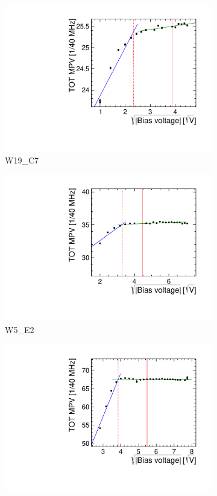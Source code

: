 \begin{figure}[htbp]
  \begin{subfigure}[b]{0.33\textwidth}
    \includegraphics[width=\textwidth]{./figures/TestBeam/depletionVoltage_W0019_C07.pdf}
    \caption{W19\_C7}
  \end{subfigure} \hfill
  \begin{subfigure}[b]{0.33\textwidth}
    \includegraphics[width=\textwidth]{./figures/TestBeam/depletionVoltage_W0005_E02.pdf}
    \caption{W5\_E2}
  \end{subfigure}\hfill
  \begin{subfigure}[b]{0.33\textwidth}
    \includegraphics[width=\textwidth]{./figures/TestBeam/depletionVoltage_W0005_F01.pdf}

\end{subfigure}
\end{figure}
